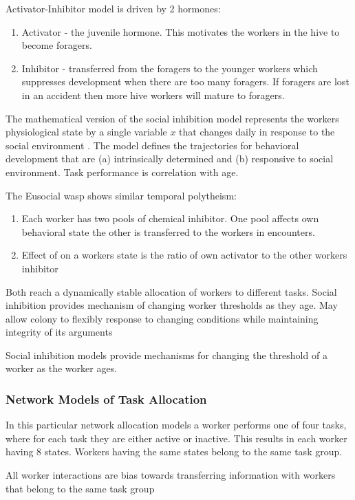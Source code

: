 Activator-Inhibitor model is driven by 2 hormones:
\begin{enumerate}
	\item Activator - the juvenile hormone. This motivates the workers in the hive to become foragers.
	\item Inhibitor - transferred from the foragers to the younger workers which suppresses development when there are too many foragers. If foragers are lost in an accident then more hive workers will mature to foragers.
\end{enumerate}

The mathematical version of the social inhibition model represents the workers physiological state by a single variable $x$ that changes daily in response to the social environment \cite{beshers2001social}. The model defines the trajectories for behavioral development that are (a) intrinsically determined and (b) responsive to social environment. Task performance is correlation with age. 

The Eusocial wasp shows similar temporal polytheism:
\begin{enumerate}
	\item Each worker has two pools of chemical inhibitor. One pool affects own behavioral state the other is transferred to the workers in encounters. 
	\item Effect of  on a workers state is the ratio of own activator to the other workers inhibitor
\end{enumerate}

Both reach a dynamically stable allocation of workers to different tasks. Social inhibition provides mechanism of changing worker thresholds as they age. May allow colony to flexibly response to changing conditions while maintaining integrity of its arguments

Social inhibition models provide mechanisms for changing the threshold of a worker as the worker ages. 

\subsubsection{Network Models of Task Allocation}
In this particular network allocation models a worker performs one of four tasks, where for each task they are either active or inactive. This results in each worker having 8 states. Workers having the same states belong to the same task group.

All worker interactions are bias towards transferring information with workers that belong to the same task group \cite{gordon1992parallel}

